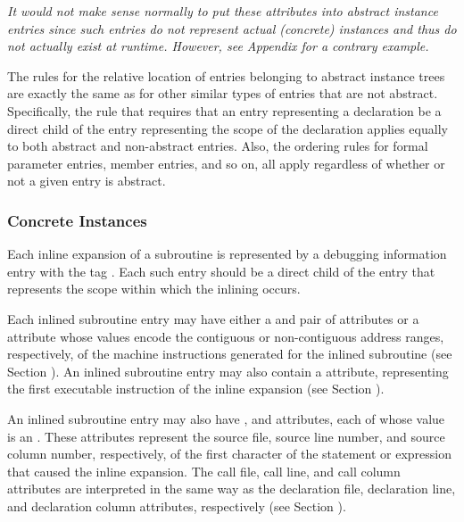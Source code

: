 \textit{It would not make sense normally to put these attributes into
abstract instance entries since such entries do not represent
actual (concrete) instances and thus do not actually exist at
run\dash time.  However, 
see Appendix  
for a contrary example.}

The rules for the relative location of entries belonging to
abstract instance trees are exactly the same as for other
similar types of entries that are not abstract. Specifically,
the rule that requires that an entry representing a declaration
be a direct child of the entry representing the scope of the
declaration applies equally to both abstract and non-abstract
entries. Also, the ordering rules for formal parameter entries,
member entries, and so on, all apply regardless of whether
or not a given entry is abstract.

\subsubsection{Concrete Instances}
\label{chap:concreteinstances}

Each inline expansion of a subroutine is represented
by a debugging information entry with the 
tag \DWTAGinlinedsubroutineTARG. 
Each such entry should be a direct
child of the entry that represents the scope within which
the inlining occurs.

Each inlined subroutine entry may have either a 
\DWATlowpc{}
and \DWAThighpc{} pair of attributes
or a \DWATranges{}
attribute whose values encode the contiguous or non-contiguous
address ranges, respectively, of the machine instructions
generated for the inlined subroutine (see 
Section ). 
An\hypertarget{chap:DWATentrypcentryaddressofinlinedsubprogram}{}
inlined subroutine entry may 
also 
contain 
a 
\DWATentrypc{}
attribute, representing the first executable instruction of
the inline expansion (see 
Section ).

An inlined\hypertarget{chap:DWATcalllinelinenumberofinlinedsubroutinecall}{}
subroutine\hypertarget{chap:DWATcallcolumncolumnpositionofinlinedsubroutinecall}{}
entry\hypertarget{chap:DWATcallfilefilecontaininginlinedsubroutinecall}{}
may also have \DWATcallfileDEFN,
\DWATcalllineDEFN{} and \DWATcallcolumnDEFN{} attributes,
each of whose
value is an . 
These attributes represent the
source file, source line number, and source column number,
respectively, of the first character of the statement or
expression that caused the inline expansion. The call file,
call line, and call column attributes are interpreted in
the same way as the declaration file, declaration line, and
declaration column attributes, respectively (see 
Section ).

